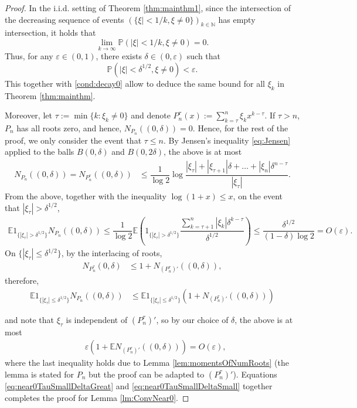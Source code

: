 \documentclass[12pt, reqno]{amsart}
\theoremstyle{plain}
\theoremstyle{definition}
\newcommand\N{{\mathbb{N}}}
\renewcommand\P{{\mathbb{P}}}
\newcommand\E{{\mathbb{E}}}
\newcommand{\ep}{\varepsilon}
\begin{document}
\begin{proof} 
In the i.i.d. setting of Theorem \ref{thm:mainthm1}, since the intersection of the decreasing sequence of events $(\{\xi|<1/k, \xi\neq 0\})_{k\in \N}$ has empty intersection, it holds that
	$$\lim_{k\to\infty} \P( |\xi| < 1/k, \xi \neq 0)=0.$$
Thus, for any $\ep \in (0, 1)$, there exists $\delta\in (0, \ep)$ such that 
	\begin{equation}
		\P( |\xi| < \delta^{1/2}, \xi \neq 0) < \ep.\label{eq:xi:small}
	\end{equation}
		This together with \eqref{cond:decay0} allow to deduce the same bound for all $\xi_k$ in Theorem \ref{thm:mainthm}.
	
	Moreover, let $\tau := \min\{k: \xi_k \neq 0\}$ and denote $P_n^{\tau}(x) := \sum_{k = \tau}^{n} \xi_{k} x^{k - \tau}$. If $\tau>n$, $P_n$ has all roots zero, and hence, $ N_{P_n}((0, \delta)) =0$. Hence, for the rest of the proof, we only consider the event that $\tau\le n$. 
By Jensen's inequality \eqref{eq:Jensen} applied to the balls $B(0, \delta)$ and $B(0, 2\delta)$, the above is at most
		\begin{align*}	
			N_{P_n}((0, \delta)) =N_{P^{\tau}_n}((0, \delta)) &\le\dfrac{1}{\log 2} \log \dfrac{|\xi_{\tau}| + |\xi_{\tau+1}| \delta + \dots + |\xi_n| \delta^{n - \tau}}{|\xi_{\tau}|}.
	\end{align*}
	From the above, together with the inequality $\log (1 + x) \le x$, on the event that $|\xi_{\tau}| > \delta^{1/2}$,
	\begin{align}\label{eq:near0TauSmallDeltaGreat}
		\E 1_{\{|\xi_{\tau}| > \delta^{1/2}\}}N_{P_n}((0, \delta)) \le \dfrac{1}{\log 2} \E \left( 1_{\{|\xi_{\tau}| > \delta^{1/2}\}} \dfrac{\sum_{k = \tau+ 1}^{n} |\xi_k| \delta^{k - \tau}}{\delta^{1/2}} \right) \le  \dfrac{\delta^{1/2}}{(1 - \delta)\log 2}= O(\ep).
	\end{align}
\vspace{5mm}
On $\{|\xi_{\tau} | \le \delta^{1/2}\}$, by the interlacing of roots,  
	\begin{align}
		N_{P_n^{\tau}}(0, \delta) &\le 1 + N_{(P_n^{\tau})' }((0, \delta)), \nonumber
\end{align}
therefore,
	\begin{align}		\E  1_{\{|\xi_{\tau}| \le \delta^{1/2}\}}N_{P_n}((0, \delta)) &\le \E 1_{\{|\xi_{\tau}| \le \delta^{1/2}\}}  (1 + N_{(P_n^{\tau})' }((0, \delta))) 
			\end{align}
		 
and note that $\xi_{\tau}$ is independent of $(P_n^{\tau})'$, so by our choice of $\delta$, the above is at most
	\begin{align}
		& \ep (1 + \E N_{(P_n^{\tau})' }((0, \delta))) =  O(\ep), \label{eq:near0TauSmallDeltaSmall}
	\end{align}
where	the last inequality holds due to Lemma \ref{lem:momentsOfNumRoots} (the lemma is stated for $P_n$ but the proof can be adapted to $(P_n^{\tau})'$). Equations \eqref{eq:near0TauSmallDeltaGreat} and \eqref{eq:near0TauSmallDeltaSmall} together completes the proof for Lemma \ref{lm:ConvNear0}.
\end{proof}
 
\end{document}
